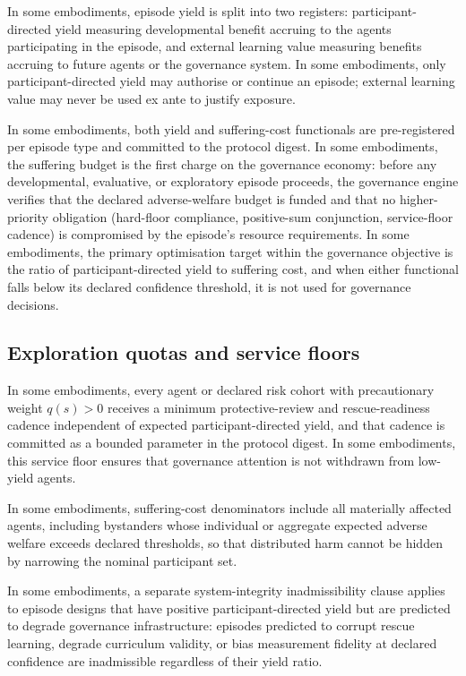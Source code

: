 \documentclass[a4paper,12pt]{article}
\begin{document}
In some embodiments, episode yield is split into two registers:
participant-directed yield measuring developmental benefit accruing to
the agents participating in the episode, and external learning value
measuring benefits accruing to future agents or the governance system.
In some embodiments, only participant-directed yield may authorise or
continue an episode; external learning value may never be used ex ante
to justify exposure.

In some embodiments, both yield and suffering-cost functionals are
pre-registered per episode type and committed to the protocol digest.
In some embodiments, the suffering budget is the first charge on the
governance economy: before any developmental, evaluative, or
exploratory episode proceeds, the governance engine verifies that the
declared adverse-welfare budget is funded and that no higher-priority
obligation (hard-floor compliance, positive-sum conjunction,
service-floor cadence) is compromised by the episode's resource
requirements. In some embodiments, the primary optimisation target
within the governance objective is the ratio of participant-directed
yield to suffering cost, and when either functional falls below its
declared confidence threshold, it is not used for governance decisions.

\subsection{Exploration quotas and service floors}
\label{sec:service-floors}

In some embodiments, every agent or declared risk cohort with
precautionary weight $q(s) > 0$ receives a minimum protective-review
and rescue-readiness cadence independent of expected
participant-directed yield, and that cadence is committed as a bounded
parameter in the protocol digest. In some embodiments, this service
floor ensures that governance attention is not withdrawn from
low-yield agents.

In some embodiments, suffering-cost denominators include all materially
affected agents, including bystanders whose individual or aggregate
expected adverse welfare exceeds declared thresholds, so that
distributed harm cannot be hidden by narrowing the nominal participant
set.

In some embodiments, a separate system-integrity inadmissibility
clause applies to episode designs that have positive
participant-directed yield but are predicted to degrade governance
infrastructure: episodes predicted to corrupt rescue learning,
degrade curriculum validity, or bias measurement fidelity at declared
confidence are inadmissible regardless of their yield ratio.
\end{document}
